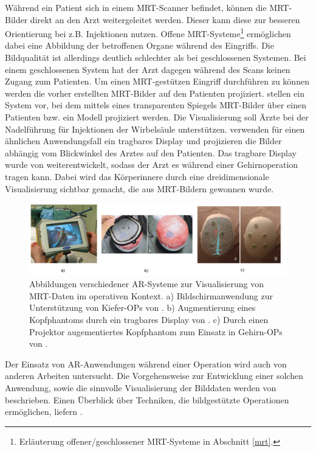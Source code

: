 Während ein Patient sich in einem MRT-Scanner befindet, können die MRT-Bilder direkt an den Arzt weitergeleitet werden. Dieser kann diese zur besseren Orientierung bei z.B. Injektionen nutzen. Offene MRT-Systeme\footnote{Erläuterung offener/geschlossener MRT-Systeme in Abschnitt \ref{mrt}.} ermöglichen dabei eine Abbildung der betroffenen Organe während des Eingriffs. Die Bildqualität ist allerdings deutlich schlechter als bei geschlossenen Systemen. Bei einem geschlossenen System hat der Arzt dagegen während des Scans keinen Zugang zum Patienten. Um einen MRT-gestützen Eingriff durchführen zu können werden die vorher erstellten MRT-Bilder auf den Patienten projiziert.
\cite{Fritz2012} stellen ein System vor, bei dem mittels eines transparenten Spiegels MRT-Bilder über einen Patienten bzw. ein Modell projiziert werden. Die Visualisierung soll Ärzte bei der Nadelführung für Injektionen der Wirbelsäule unterstützen. 
\cite{khamene03} verwenden für einen ähnlichen Anwendungsfall ein tragbares Display und projizieren die Bilder abhängig vom Blickwinkel des Arztes auf den Patienten. Das tragbare Display wurde von \cite{khamene01} weiterentwickelt, sodass der Arzt es während einer Gehirnoperation tragen kann. Dabei wird das Körperinnere durch eine dreidimensionale Visualisierung sichtbar gemacht, die aus MRT-Bildern gewonnen wurde. 

\begin{figure}[!htb]
	\centering
	\includegraphics[width=0.9\linewidth]{images/relatedMedicine.png}
	\caption{Abbildungen verschiedener AR-Systeme zur Visualisierung von MRT-Daten im operativen Kontext. a) Bildschirmanwendung zur Unterstützung von Kiefer-OPs von \cite{MISCHKOWSKI2006478}. b) Augmentierung eines Kopfphantoms durch ein tragbares Display von \cite{Wendt03}. c) Durch einen Projektor augementiertes Kopfphantom zum Einsatz in Gehirn-OPs von \cite{Tabrizi15}.}
	\label{img:relatedMed}
\end{figure}
\FloatBarrier

Der Einsatz von AR-Anwendungen während einer Operation wird auch von anderen Arbeiten untersucht.
Die Vorgehensweise zur Entwicklung einer solchen Anwendung, sowie die sinnvolle Visualisierung der Bilddaten werden von \cite{grimson99} beschrieben. Einen Überblick über Techniken, die bildgestützte Operationen ermöglichen, liefern \cite{KerstenOertel2013TheSO}.

